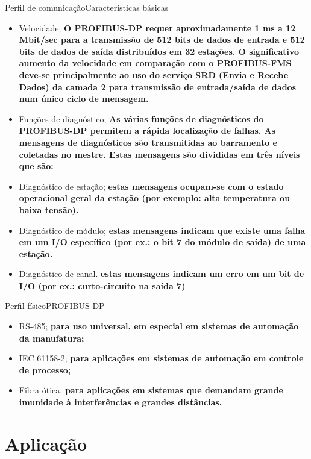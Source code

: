 \documentclass{beamer}
\begin{document}
\begin{frame}{Perfil de comunicação}{Características básicas}
	\begin{tiny}
	\begin{itemize}
		\item Velocidade; \textbf{O PROFIBUS-DP requer aproximadamente 1 ms a 12 Mbit/sec para a transmissão de 512 bits de dados de entrada e 512 bits de dados de saída distribuídos em 32 estações. O significativo aumento da velocidade em comparação com o PROFIBUS-FMS deve-se principalmente ao uso do serviço SRD (Envia e Recebe Dados) da camada 2 para transmissão de entrada/saída de dados num único ciclo de mensagem.}
		\item Funções de diagnóstico; \textbf{As várias funções de diagnósticos do PROFIBUS-DP permitem a rápida localização de falhas. As mensagens de diagnósticos são transmitidas ao barramento e coletadas no mestre. Estas mensagens são divididas em três níveis que são: }
		\item Diagnóstico de estação; \textbf{estas mensagens ocupam-se com o estado operacional geral da estação (por exemplo: alta temperatura ou baixa tensão). }
		\item Diagnóstico de módulo; \textbf{estas mensagens indicam que existe uma falha em um I/O específico (por ex.: o
bit 7 do módulo de saída) de uma estação.}
		\item Diagnóstico de canal. \textbf{ estas mensagens indicam um erro em um bit de I/O (por ex.: curto-circuito na 
saída 7)}
	\end{itemize}
\end{tiny}
\end{frame}

\begin{frame}{Perfil físico}{PROFIBUS DP}
	
	\begin{itemize}
		\item RS-485; \textbf{para uso universal, em especial em sistemas de automação da manufatura; }
		\item IEC 61158-2;\textbf{ para aplicações em sistemas de automação em controle de processo; }
		\item Fibra ótica.\textbf{ para aplicações em sistemas que demandam grande imunidade à interferências e 
grandes distâncias.}
	\end{itemize}

\end{frame}


\section{Aplicação}
\end{document}
